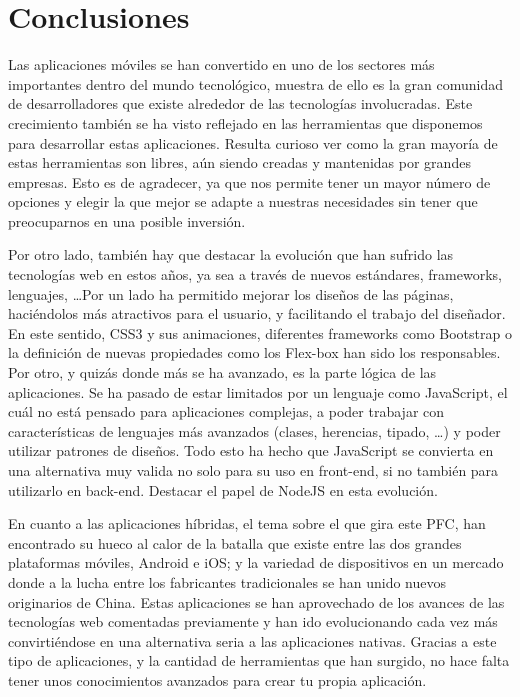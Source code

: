 \chapter*{Conclusiones}

Las aplicaciones móviles se han convertido en uno de los sectores más importantes dentro del mundo tecnológico, muestra de ello es la gran comunidad de desarrolladores que existe alrededor de las tecnologías involucradas. Este crecimiento también se ha visto reflejado en las herramientas que disponemos para desarrollar estas aplicaciones. Resulta curioso ver como la gran mayoría de estas herramientas son libres, aún siendo creadas y mantenidas por grandes empresas. Esto es de agradecer, ya que nos permite tener un mayor número de opciones y elegir la que mejor se adapte a nuestras necesidades sin tener que preocuparnos en una posible inversión.

Por otro lado, también hay que destacar la evolución que han sufrido las tecnologías web en estos años, ya sea a través de nuevos estándares, frameworks, lenguajes, \ldots Por un lado ha permitido mejorar los diseños de las páginas, haciéndolos más atractivos para el usuario, y facilitando el trabajo del diseñador. En este sentido, \gls{CSS3} y sus animaciones, diferentes frameworks como Bootstrap o la definición de nuevas propiedades como los Flex-box han sido los responsables. Por otro, y quizás donde más se ha avanzado, es la parte lógica de las aplicaciones. Se ha pasado de estar limitados por un lenguaje como JavaScript, el cuál no está pensado para aplicaciones complejas, a poder trabajar con características de lenguajes más avanzados (clases, herencias, tipado, \ldots) y poder utilizar patrones de diseños. Todo esto ha hecho que JavaScript se convierta en una alternativa muy valida no solo para su uso en front-end, si no también para utilizarlo en back-end. Destacar el papel de NodeJS en esta evolución.

En cuanto a las aplicaciones híbridas, el tema sobre el que gira este \gls{PFC}, han encontrado su hueco al calor de la batalla que existe entre las dos grandes plataformas móviles, Android e iOS; y la variedad de dispositivos en un mercado donde a la lucha entre los fabricantes tradicionales se han unido nuevos originarios de China. Estas aplicaciones se han aprovechado de los avances de las tecnologías web comentadas previamente y han ido evolucionando cada vez más convirtiéndose en una alternativa seria a las aplicaciones nativas. Gracias a este tipo de aplicaciones, y la cantidad de herramientas que han surgido, no hace falta tener unos conocimientos avanzados para crear tu propia aplicación.


